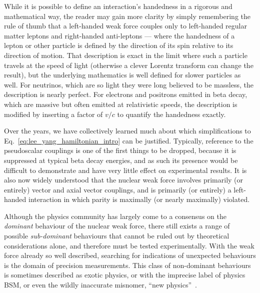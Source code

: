 While it is possible to define an interaction's handedness in a rigorous and mathematical way, the reader may gain more clarity by simply remembering the rule of thumb that a left-handed weak force 
couples only to left-handed regular matter leptons and right-handed anti-leptons --- where the handedness of a lepton or other particle is defined by the direction of its spin relative to its direction of motion.  That description is exact in the limit where such a particle travels at the speed of light (otherwise a clever Lorentz transform can change the result), but the underlying mathematics is well defined for slower particles as well.  For neutrinos, which are so light they were long believed to be massless, the description is nearly perfect.  For electrons and positrons emitted in beta decay, which are massive but often emitted at relativistic speeds, the description is modified by inserting a factor of $v/c$ to quantify the handedness exactly.  


Over the years, we have collectively learned much about which simplifications to Eq.~\ref{eq:lee_yang_hamiltonian_intro} can be justified.  Typically, reference to the pseudoscalar couplings is one of the first things to be dropped, because it is suppressed at typical beta decay energies, and as such its presence would be difficult to demonstrate and have very little effect on experimental results.  
It is also now widely understood that 
the nuclear weak force involves primarily (or entirely) vector and axial vector couplings, and is primarily (or entirely) a left-handed interaction in which parity is maximally (or nearly maximally) violated.  



Although the physics community has largely come to a consensus 
on the \emph{dominant} behaviour of the nuclear weak force, there still exists a range of possible \emph{sub-dominant} behaviours that cannot be ruled out by theoretical considerations alone, and therefore must be tested experimentally.  With the weak force already so well described, searching for indications of unexpected behaviours is the domain of precision measurements.  This class of non-dominant behaviours is sometimes described as exotic physics, or with the imprecise label of physics \ac{BSM}, or even the wildly inaccurate misnomer, ``new physics''~\cite{Combs2020,GonzalesalonsoNaviliatcuncicSeverijns2019,newphysics_cirgiliano2019,newphysics_neutrinoless2015,newphysics_neutrinoless2007,newphysics_1998,newphysics_1992langacker}.  

